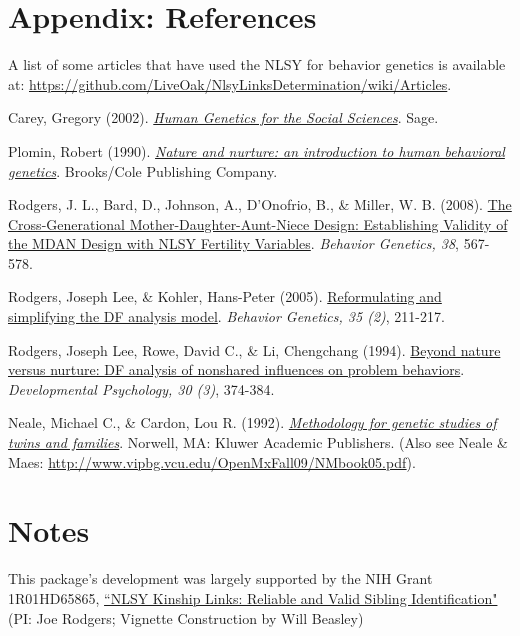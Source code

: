 \documentclass{article}\usepackage[]{graphicx}\usepackage[]{color}
\begin{document}
\section{Appendix: References} \label{sec:References}
A list of some articles that have used the NLSY for behavior genetics is available at: \url{https://github.com/LiveOak/NlsyLinksDetermination/wiki/Articles}.

Carey, Gregory (2002). \href{http://psych.colorado.edu/~carey/hgss/}{\emph{Human Genetics for the Social Sciences}}. Sage.

Plomin, Robert (1990). \href{http://books.google.com/books?id=r7AgAQAAIAAJ&source=gbs_navlinks_s}{\emph{Nature and nurture: an introduction to human behavioral genetics}}.  Brooks/Cole Publishing Company.

Rodgers, J. L., Bard, D., Johnson, A., D'Onofrio, B., \& Miller, W. B. (2008). \href{http://www.ncbi.nlm.nih.gov/pubmed/18825497}{The Cross-Generational Mother-Daughter-Aunt-Niece Design: Establishing Validity of the MDAN Design with NLSY Fertility Variables}. \emph{Behavior Genetics, 38}, 567-578.

Rodgers, Joseph Lee, \& Kohler, Hans-Peter (2005). \href{http://www.springerlink.com/content/n3x1v1q282583366}{Reformulating and simplifying the DF analysis model}. \emph{Behavior Genetics, 35 (2)}, 211-217.

Rodgers, Joseph Lee, Rowe, David C., \& Li, Chengchang (1994). \href{http://psycnet.apa.org/journals/dev/30/3/374/}{Beyond nature versus nurture: DF analysis of nonshared influences on problem behaviors}. \emph{Developmental Psychology, 30 (3)}, 374-384. 

Neale, Michael C., \& Cardon, Lou R. (1992). \href{http://books.google.com/books/about/Methodology_for_genetic_studies_of_twins.html?id=vVzDmDv6WDkC}{\emph{Methodology for genetic studies of twins and families}}. Norwell, MA: Kluwer Academic Publishers. (Also see Neale \& Maes: \url{http://www.vipbg.vcu.edu/OpenMxFall09/NMbook05.pdf}).
 
\section{Notes}
This package's development was largely supported by the NIH Grant 1R01HD65865, \href{http://taggs.hhs.gov/AwardDetail.cfm?s_Award_Num=R01HD065865&n_Prog_Office_Code=50}{``NLSY Kinship Links: Reliable and Valid Sibling Identification"} (PI: Joe Rodgers; Vignette Construction by Will Beasley)
\end{document}
